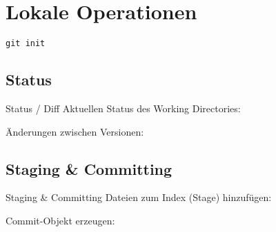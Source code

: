 \section{Lokale Operationen}

\begin{frame}{}
    \vspace{2cm}
    \center \Huge \texttt{git init}
\end{frame}

\subsection{Status}
\begin{frame}{Status / Diff}
    Aktuellen Status des Working Directories:\\[1em]


    \vspace{1em}
    \pause

    Änderungen zwischen Versionen:\\[1em]

\end{frame}


\subsection{Staging \& Committing}
\begin{frame}{Staging \& Committing}
    Dateien zum Index (Stage) hinzufügen:\\[1em]


    \vspace{1em}

    Commit-Objekt erzeugen:\\[1em]

\end{frame}


